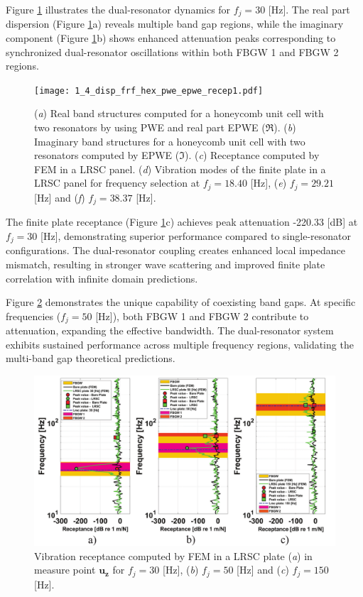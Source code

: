 \documentclass[review,numbers,sort&compress]{elsarticle}
\begin{document}
Figure \ref{lat_h_pwe_epwe_tr_frf} illustrates the dual-resonator dynamics for $f_j = 30$ [Hz]. The real part dispersion (Figure \ref{lat_h_pwe_epwe_tr_frf}a) reveals multiple band gap regions, while the imaginary component (Figure \ref{lat_h_pwe_epwe_tr_frf}b) shows enhanced attenuation peaks corresponding to synchronized dual-resonator oscillations within both FBGW 1 and FBGW 2 regions.
\newpage
\begin{figure}[htb]
	\centering
	\texttt{[image: 1\_4\_disp\_frf\_hex\_pwe\_epwe\_recep1.pdf]}
	\caption{(\textit{a}) Real band structures computed for a honeycomb unit cell with two resonators by using PWE and real part EPWE ($\Re$). (\textit{b}) Imaginary band structures for a honeycomb unit cell with two resonators computed by EPWE ($\Im$). (\textit{c}) Receptance computed by FEM in a LRSC panel. (\textit{d}) Vibration modes of the finite plate in a LRSC panel for frequency selection at $f_j = 18.40$ [Hz], (\textit{e}) $f_j = 29.21$ [Hz] and (\textit{f}) $f_j = 38.37$ [Hz].}
	\label{lat_h_pwe_epwe_tr_frf}
\end{figure}

The finite plate receptance (Figure \ref{lat_h_pwe_epwe_tr_frf}c) achieves peak attenuation -220.33 [dB] at $f_j = 30$ [Hz], demonstrating superior performance compared to single-resonator configurations. The dual-resonator coupling creates enhanced local impedance mismatch, resulting in stronger wave scattering and improved finite plate correlation with infinite domain predictions.

Figure \ref{lat_h_tr_frf_f1_f2_f3} demonstrates the unique capability of coexisting band gaps. At specific frequencies ($f_j = 50$ [Hz]), both FBGW 1 and FBGW 2 contribute to attenuation, expanding the effective bandwidth. The dual-resonator system exhibits sustained performance across multiple frequency regions, validating the multi-band gap theoretical predictions.
\newpage
\begin{figure}[htb]
	\centering
	\includegraphics[width=1.0\textwidth]{2_4_disp_frf_hex_3_receps.pdf}
	\caption{Vibration receptance computed by FEM in a LRSC plate (\textit{a}) in measure point $\mathbf{u_z}$  for $f_j = 30$ [Hz], (\textit{b}) $f_j = 50$ [Hz] and (\textit{c}) $f_j = 150$ [Hz].}
	\label{lat_h_tr_frf_f1_f2_f3}
\end{figure}
\end{document}
